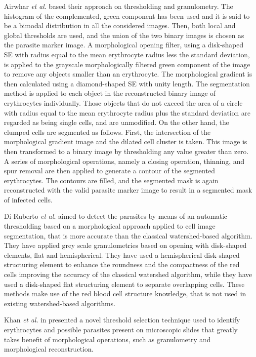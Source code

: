 \documentclass[sensors,review,submit,moreauthors,pdftex,10pt,a4paper]{mdpi}
\begin{document}
Airwhar \emph{et al.} \cite{Ahirwar2012} based their approach on thresholding and granulometry. The histogram of the complemented, green component has been used and it is said to be a bimodal distribution in all the considered images. Then, both local and global thresholds are used, and the union of the two binary images is chosen as the parasite marker image. A morphological opening filter, using a disk-shaped SE with radius equal to the mean erythrocyte radius less the standard deviation, is applied to the grayscale morphologically filtered green component of the image to remove any objects smaller than an erythrocyte. The morphological gradient is then calculated using a diamond-shaped SE with unity length. The segmentation method is applied to each object in the reconstructed binary image of erythrocytes individually. Those objects that do not exceed the area of a circle with radius equal to the mean erythrocyte radius plus the standard deviation are regarded as being single cells, and are unmodified.
On the other hand, the clumped cells are segmented as follows. First, the intersection of the morphological gradient image and the dilated cell cluster is taken. This image is then transformed to a binary image by thresholding any value greater than zero. A series of morphological operations, namely a closing operation, thinning, and spur removal are then applied to generate a contour of the segmented erythrocytes. The contours are filled, and the segmented mask is again reconstructed with the valid parasite marker image to result in a segmented mask of infected cells.

Di Ruberto \emph{et al.} \cite{DiRuberto2002} aimed to detect the parasites by means of an automatic thresholding based on a morphological approach applied to cell image segmentation, that is more accurate than the classical watershed-based algorithm. They have applied grey scale granulometries based on opening with disk-shaped elements, flat and hemispherical. They have used a hemispherical disk-shaped structuring element to enhance the roundness and the compactness of the red cells improving the accuracy of the classical watershed algorithm, while they have used a disk-shaped flat structuring element to separate overlapping cells. These methods make use of the red blood cell structure knowledge, that is not used in existing watershed-based algorithms.

Khan \emph{et al.} in \cite{Khan2011} presented a novel threshold selection technique used to identify erythrocytes and possible parasites present on microscopic slides that greatly takes benefit of morphological operations, such as granulometry and morphological reconstruction.
\end{document}
